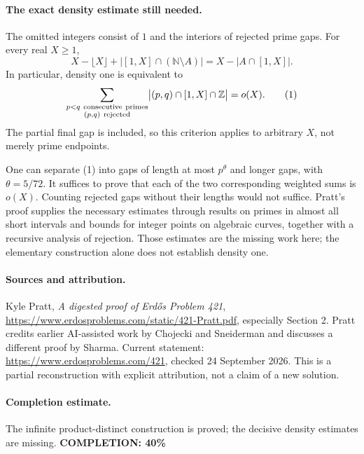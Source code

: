 \paragraph{The exact density estimate still needed.}
The omitted integers consist of \(1\) and the interiors of rejected
prime gaps. For every real \(X\geq1\),
\[
 X-\lfloor X\rfloor+\bigl|[1,X]\cap(\mathbb N\setminus A)\bigr|
 =X-|A\cap[1,X]|.
\]
In particular, density one is equivalent to
\[
 \sum_{\substack{p<q\ {\rm consecutive\ primes}\\(p,q)\ {\rm rejected}}}
 \bigl|(p,q)\cap[1,X]\cap\mathbb Z\bigr|=o(X).
 \tag{1}
\]
The partial final gap is included, so this criterion applies to arbitrary
\(X\), not merely prime endpoints.

One can separate (1) into gaps of length at most \(p^\theta\) and
longer gaps, with \(\theta=5/72\). It suffices to prove that each of the
two corresponding weighted sums is \(o(X)\). Counting rejected gaps
without their lengths would not suffice.
Pratt's proof supplies the necessary estimates through results on
primes in almost all short intervals and bounds for integer points
on algebraic curves, together with a recursive analysis of rejection.
Those estimates are the missing work here; the elementary construction
alone does not establish density one.

\paragraph{Sources and attribution.}
Kyle Pratt, \emph{A digested proof of Erd\H{o}s Problem 421},
\url{https://www.erdosproblems.com/static/421-Pratt.pdf},
especially Section 2. Pratt credits earlier AI-assisted work by
Chojecki and Sneiderman and discusses a different proof by Sharma.
Current statement: \url{https://www.erdosproblems.com/421},
checked 24 September 2026. This is a partial reconstruction with
explicit attribution, not a claim of a new solution.

\paragraph{Completion estimate.}
The infinite product-distinct construction is proved; the decisive density estimates are missing.
\textbf{COMPLETION: 40\%}
